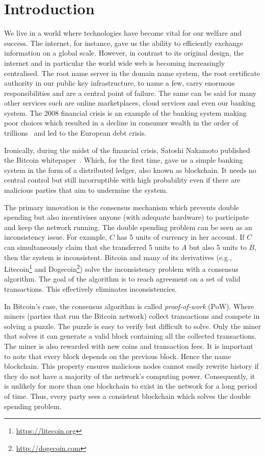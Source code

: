 \chapter{Introduction}
\label{ch:intro}

We live in a world where technologies have become vital for our welfare and success.
The internet, for instance, gave us the ability to efficiently exchange information on a global scale.
However, in contrast to its original design, the internet and in particular the world wide web is becoming increasingly centralised.
The root name server in the domain name system,
the root certificate authority in our public key infrastructure,
to name a few, carry enormous responsibilities and are a central point of failure.
The  same can be said for many other services such are online marketplaces,
cloud services and even our banking system.
The 2008 financial crisis is an example of the banking system making poor choices which resulted in a
decline in consumer wealth in the order of trillions~\cite{financialcrisis} and led to the European debt crisis.

Ironically, during the midst of the financial crisis, Satoshi Nakamoto published the Bitcoin whitepaper~\cite{bitcoin}.
Which, for the first time, gave us a simple banking system in the form of a distributed ledger, also known as blockchain.
It needs no central control but still incorruptible with high probability even if there are malicious parties that aim to undermine the system.

The primary innovation is the consensus mechanism which prevents double spending but also incentivises anyone (with adequate hardware) to participate and keep the network running.
The double spending problem can be seen as an inconsistency issue.
For example, $C$ has 5 units of currency in her account.
If $C$ can simultaneously claim that she transferred 5 units to $A$ but also 5 units to $B$, then the system is inconsistent.
Bitcoin and many of its derivatives (e.g., Litecoin\footnote{\url{https://litecoin.org}} and Dogecoin\footnote{\url{http://dogecoin.com}}) solve the inconsistency problem with a consensus algorithm.
The goal of the algorithm is to reach agreement on a set of valid transactions. 
This effectively eliminates inconsistencies.

In Bitcoin's case, the consensus algorithm is called \emph{proof-of-work} (PoW).
Where miners (parties that run the Bitcoin network) collect transactions and compete in solving a puzzle.
The puzzle is easy to verify but difficult to solve.
Only the miner that solves it can generate a valid block containing all the collected transactions.
The miner is also rewarded with new coins and transaction fees.
It is important to note that every block depends on the previous block.
Hence the name blockchain.
This property ensures malicious nodes cannot easily rewrite history if they do not have a majority of the network's computing power.
Consequently, it is unlikely for more than one blockchain to exist in the network for a long period of time.
Thus, every party sees a consistent blockchain which solves the double spending problem.

